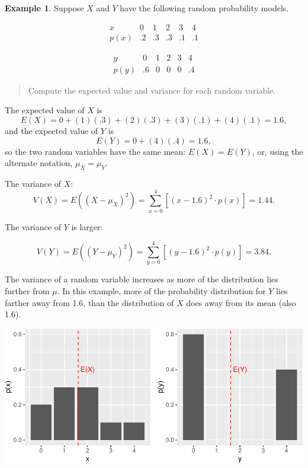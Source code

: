 \documentclass[
]{book}
\theoremstyle{definition}
\theoremstyle{definition}
\newtheorem{example}{Example}[chapter]
\theoremstyle{definition}
\theoremstyle{definition}
\theoremstyle{remark}
\begin{document}
\begin{example}
\protect\hypertarget{exm:variance-comparison}{}\label{exm:variance-comparison}Suppose \(X\) and \(Y\) have the following random probability models.

\[
\begin{array}{c|c|c|c|c|c}
x & 0 & 1 & 2 & 3 & 4 \\ \hline
p(x) & .2 & .3 & .3 & .1 & .1
\end{array}
\]

\[
\begin{array}{c|c|c|c|c|c}
y & 0 & 1 & 2 & 3 & 4\\ \hline
p(y) & .6 & 0 & 0 & 0 & .4 
\end{array}
\]

\begin{quote}
Compute the expected value and variance for each random variable.
\end{quote}

The expected value of \(X\) is \[E(X) = 0 + (1)(.3) + (2)(.3) + (3)(.1) + (4)(.1) = 1.6,\] and the expected value of \(Y\) is \[E(Y) = 0 + (4)(.4) = 1.6,\]
so the two random variables have the same mean: \(E(X) = E(Y)\), or, using the alternate notation, \(\mu_X = \mu_Y\).

The variance of \(X\): \[V(X) = E((X-\mu_X)^2) = \sum_{x = 0}^4[(x-1.6)^2\cdot p(x)]= 1.44.\]

The variance of \(Y\) is larger:

\[V(Y) = E((Y-\mu_Y)^2) = \sum_{y = 0}^4[(y-1.6)^2\cdot p(y)]= 3.84.\]

The variance of a random variable increases as more of the distribution lies further from \(\mu\). In this example, more of the probability distribution for \(Y\) lies farther away from 1.6, than the distribution of \(X\) does away from its mean (also 1.6).

\includegraphics{math340-notes_files/figure-latex/unnamed-chunk-11-1.pdf}
\end{example}
\end{document}
